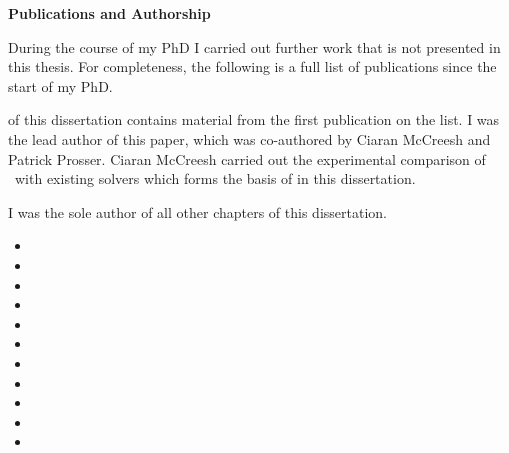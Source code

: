 \vspace*{1.75in}

\begin{center} {\bf Publications and Authorship}\end{center}

During the course of my PhD I carried out further work
that is not presented in this thesis.
For completeness, the following is a full list of publications
since the start of my PhD.

 of this dissertation contains material from the
first publication on the list.  I was the lead author of this paper, which was
co-authored by Ciaran McCreesh and Patrick Prosser.
Ciaran McCreesh carried out the experimental comparison of \McSplit\ with
existing solvers which forms the basis of  in
this dissertation.

I was the sole author of all other chapters of this dissertation.

\begin{itemize}
    \item{}
    \item{}
    \item{}
    \item{}
    \item{}
    \item{}
    \item{}
    \item{}
    \item{}
    \item{}
    \item{}
\end{itemize}
